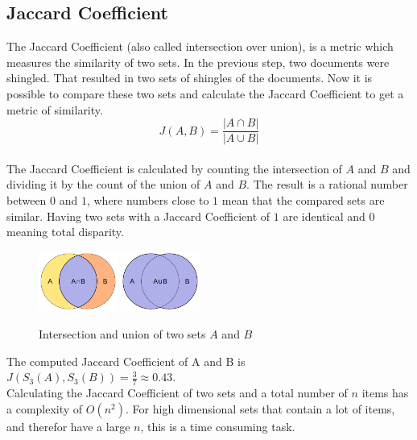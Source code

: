 \subsection{Jaccard Coefficient}

The Jaccard Coefficient (also called intersection over union), is a metric which measures the similarity of two sets. In the previous step, two documents were shingled. That resulted in two sets of shingles of the documents. Now it is possible to compare these two sets and calculate the Jaccard Coefficient to get a metric of similarity.\\

\begin{equation}
    J(A,B) = \frac{ | A \cap B | }{ | A \cup B | }
\end{equation} \\

The Jaccard Coefficient is calculated by counting the intersection of $ A $ and $ B $ and dividing it by the count of the union of $ A $ and $ B $. The result is a rational number between $ 0 $ and $ 1 $, where numbers close to $ 1 $ mean that the compared sets are similar. Having two sets with a Jaccard Coefficient of $ 1 $ are identical and $ 0 $ meaning total disparity.\\

\begin{figure}[H]
    \centering
    \includegraphics[width=0.23\textwidth]{images/Intersection_of_sets_A_and_B.png} 
    \includegraphics[width=0.23\textwidth]{images/Union_of_sets_A_and_B.png}
    \caption{Intersection and union of two sets $ A $ and $ B $ \cite{intersectionImage,unionImage}}
\end{figure}

The computed Jaccard Coefficient of A and B is  $ J(S_3(A),S_3(B)) = \frac{3}{7} \approx 0.43 $.\\

Calculating the Jaccard Coefficient of two sets and a total number of $ n $ items has a complexity of $ O(n^2) $. For high dimensional sets that contain a lot of items, and therefor have a large $ n $, this is a time consuming task.\\

